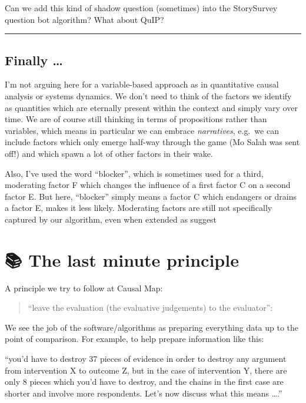 \documentclass[
]{book}
\begin{document}
Can we add this kind of shadow question (sometimes) into the StorySurvey question bot algorithm? What about QuIP?

\begin{center}\rule{0.5\linewidth}{0.5pt}\end{center}

\hypertarget{finally}{%
\section{Finally \ldots{}}\label{finally}}

I'm not arguing here for a variable-based approach as in quantitative causal analysis or systems dynamics. We don't need to think of the factors we identify as quantities which are eternally present within the context and simply vary over time. We are of course still thinking in terms of propositions rather than variables, which means in particular we can embrace \emph{narratives}, e.g.~we can include factors which only emerge half-way through the game (Mo Salah was sent off!) and which spawn a lot of other factors in their wake.

Also, I've used the word ``blocker'', which is sometimes used for a third, moderating factor F which changes the influence of a first factor C on a second factor E. But here, ``blocker'' simply means a factor C which endangers or drains a factor E, makes it less likely. Moderating factors are still not specifically captured by our algorithm, even when extended as suggest

\hypertarget{the-last-minute-principle}{%
\chapter{📚 The last minute principle}\label{the-last-minute-principle}}

A principle we try to follow at Causal Map:

\begin{quote}
``leave the evaluation (the evaluative judgements) to the evaluator'':
\end{quote}

We see the job of the software/algorithms as preparing everything data up to the point of comparison. For example, to help prepare information like this:

``you'd have to destroy 37 pieces of evidence in order to destroy any argument from intervention X to outcome Z, but in the case of intervention Y, there are only 8 pieces which you'd have to destroy, and the chains in the first case are shorter and involve more respondents. Let's now discuss what this means \ldots.''
\end{document}
